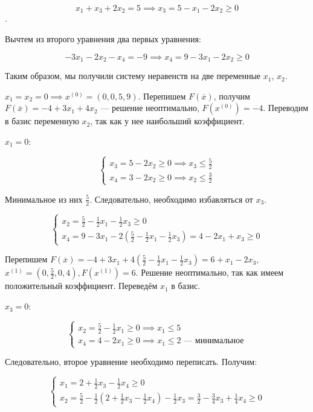 \documentclass{article}
\begin{document}
$$x_1 + x_3 + 2x_2 = 5 \implies x_3 = 5 - x_1 - 2x_2 \ge 0$$.

Вычтем из второго уравнения два первых уравнения:

$$-3x_1 - 2x_2 - x_4 = -9 \implies x_4 = 9 - 3x_1 - 2x_2 \ge 0$$

Таким образом, мы получили систему неравенств на две переменные $x_1$, $x_2$.

$x_1 = x_2 = 0 \implies x^{(0)} = (0,0,5,9)$. Перепишем $F(\overline{x})$, получим $F(\overline{x}) = -4 + 3x_1 + 4x_2$ — решение неоптимально, $F(x^{(0)}) = -4$. Переводим в базис переменную $x_2$, так как у нее наибольший коэффициент.

$x_1 = 0$:

$$
\begin{cases}
    x_3 = 5 - 2x_2 \ge 0 \implies x_3 \le \frac{5}{2} \\
    x_4 = 3 - 2x_2 \ge 0 \implies x_2 \le \frac{3}{2}
\end{cases}
$$

Минимальное из них $\frac{5}{2}$. Следовательно, необходимо избавляться от $x_3$.

$$
\begin{cases}
x_2 = \frac{5}{2} - \frac{1}{2} x_1 - \frac{1}{2} x_3 \ge 0 \\
x_4 = 9 - 3x_1 - 2 (\frac{5}{2} - \frac{1}{2} x_1 - \frac{1}{2} x_3) = 4 - 2x_1 + x_3 \ge 0
\end{cases}
$$

Перепишем $F(\overline{x}) = -4 + 3x_1 + 4 (\frac{5}{2} - \frac{1}{2} x_1 - \frac{1}{2} x_3) = 6 + x_1 - 2x_3$, $x^{(1)} = (0,\frac{5}{2},0,4), F(x^{(1)}) = 6$. Решение неоптимально, так как имеем положительный коэффициент. Переведём $x_1$ в базис.

$x_3 = 0$:

$$
\begin{cases}
  x_2 = \frac{5}{2} - \frac{1}{2} x_1 \ge 0 \implies x_1 \le 5 \\
  x_4 = 4 - 2x_1 \ge 0 \implies x_1 \le 2 \text{ — минимальное}  
\end{cases}
$$

Следовательно, второе уравнение необходимо переписать. Получим:

$$
\begin{cases}
  x_1 = 2 + \frac{1}{2} x_3 - \frac{1}{2} x_4 \ge 0 \\
  x_2 = \frac{5}{2} - \frac{1}{2} (2 + \frac{1}{2} x_3 - \frac{1}{2} x_4) - \frac{1}{2} x_3 = \frac{3}{2} - \frac{3}{4} x_3 + \frac{1}{4} x_4 \ge 0  
\end{cases}
$$
\end{document}

